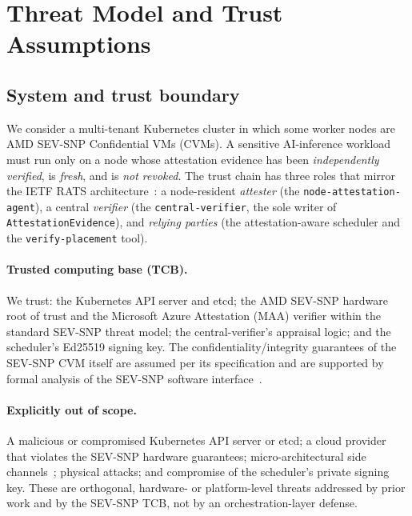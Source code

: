 
\section{Threat Model and Trust Assumptions}
\label{sec:threat}

\subsection{System and trust boundary}
We consider a multi-tenant Kubernetes cluster in which some worker nodes are AMD
SEV-SNP Confidential VMs (CVMs). A sensitive AI-inference workload must run only
on a node whose attestation evidence has been \emph{independently verified},
is \emph{fresh}, and is \emph{not revoked}. The trust chain has three roles that
mirror the IETF RATS architecture~\cite{birkholz2023rats}: a node-resident
\emph{attester} (the \texttt{node-attestation-agent}), a central
\emph{verifier} (the \texttt{central-verifier}, the sole writer of
\texttt{AttestationEvidence}), and \emph{relying parties} (the
attestation-aware scheduler and the \texttt{verify-placement} tool).

\paragraph{Trusted computing base (TCB).}
We trust: the Kubernetes API server and etcd; the AMD SEV-SNP hardware root of
trust and the Microsoft Azure Attestation (MAA) verifier within the standard
SEV-SNP threat model; the central-verifier's appraisal logic; and the
scheduler's Ed25519 signing key. The confidentiality/integrity guarantees of
the SEV-SNP CVM itself are assumed per its specification and are supported by
formal analysis of the SEV-SNP software interface~\cite{paradzik2024sevsnp}.

\paragraph{Explicitly out of scope.}
A malicious or compromised Kubernetes API server or etcd; a cloud provider that
violates the SEV-SNP hardware guarantees; micro-architectural side
channels~\cite{li2021cipherleaks}; physical attacks; and compromise of the
scheduler's private signing key. These are orthogonal, hardware- or
platform-level threats addressed by prior work and by the SEV-SNP TCB, not by an
orchestration-layer defense.

